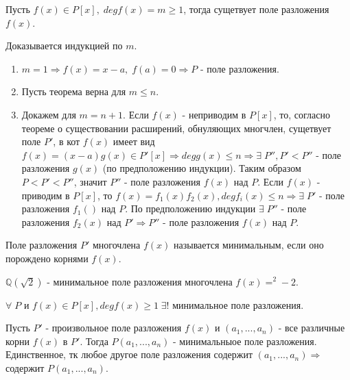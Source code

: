 \begin{proofs}
	Пусть $f(x) \in P[x],\; degf(x) = m \geq 1$, тогда сущетвует поле разложения $f(x)$.
  \begin{dokvo}
    Доказывается индукцией по $m.\;$
    \begin{enumerate}
    \item $m = 1 \Rightarrow f(x) = x-a,\; f(a) = 0 \Rightarrow P$ - поле разложения.
    \item Пусть теорема верна для $m \leq n$.
    \item Докажем для $m = n + 1$. Если $f(x)$ - неприводим в $P[x]$, то, согласно теореме о существовании расширений, обнуляющих многчлен,
    сущетвует поле $P'$, в кот $f(x)$ имеет вид $f(x) = (x-a)g(x) \in P'[x] \Rightarrow degg(x) \leq n \Rightarrow \exists\; P'', P' < P''$
    - поле разложения $g(x)$ (по предположению индукции). Таким образом $P < P' < P''$, значит $P''$ - поле разложения
    $f(x)$ над $P$. Если $f(x)$ - приводим в $P[x]$, то $f(x) = f_1(x)f_2(x), degf_i(x) \leq n \Rightarrow \exists\; P'$ - поле разложения
    $f_1()$ над $P$. По предположению индукции $\exists\; P''$ - поле разложения $f_2(x)$ над $P'\Rightarrow P''$ - поле разложения
    $f(x)$ над $P$.
  \end{enumerate}
	\end{dokvo}
\end{proofs}

\begin{defs}
  Поле разложения $P'$ многочлена $f(x)$ называется минимальным, если оно порождено корнями $f(x)$.
\end{defs}

\begin{example}
  $\mathbb{Q}(\sqrt{2})$ - минимальное поле разложения многочлена $f(x) = ^2 - 2$.
\end{example}

\begin{proofs}
	$\forall\; P$ и $f(x) \in P[x], degf(x) \geq 1\; \exists!$ минимальное поле разложения.
  \begin{dokvo}
    Пусть $P'$ - произвольное поле разложения $f(x)$ и $(a_1, ... , a_n)$ - все различные корни $f(x)$ в $P'$. 
    Тогда $P(a_1, ... , a_n)$ - минимальныое поле разложения. Единственное, тк любое другое поле разложения содержит
    $(a_1, ... , a_n) \Rightarrow $ содержит $P(a_1, ... , a_n)$. 
	\end{dokvo}
\end{proofs}

\newpage
